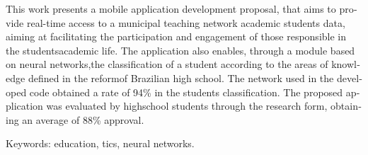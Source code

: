 \begin{resumo}[Abstract]
    \begin{otherlanguage}{english}
        This work presents a mobile application development proposal, that aims to provide real-time access to a municipal teaching network academic students data, aiming at facilitating the participation and engagement of those responsible in the studentsacademic life. The application also enables, through a module based on neural networks,the classification of a student according to the areas of knowledge defined in the reformof Brazilian high school. The network used in the developed code obtained a rate of 94\% in the students classification.  The proposed application was evaluated by highschool students through the research form, obtaining an average of 88\% approval.
        
        Keywords: education, tics, neural networks.
    \end{otherlanguage}
\end{resumo}